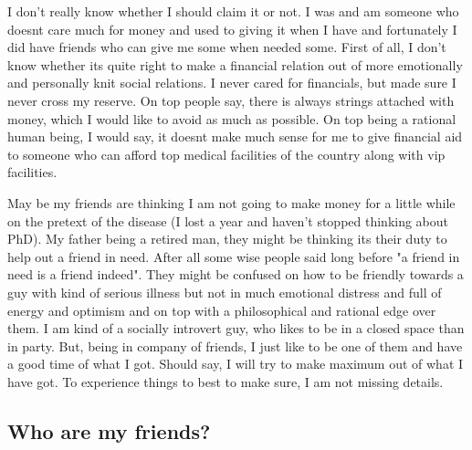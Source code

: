I don't really know whether I should claim it or not. I was and am someone who doesnt care much 
for money and used to giving it when I have and fortunately I did have friends who can give me 
some when needed some. First of all, I don't know whether its quite right to make a financial 
relation out of more emotionally and personally knit social relations. I never cared for financials, 
but made sure I never cross my reserve. On top people say, there is always strings attached with 
money, which I would like to avoid as much as possible. On top being a rational human being, I would 
say, it doesnt make much sense for me to give financial aid to someone who can afford top medical facilities of the country along with vip facilities. 

May be my friends are thinking I am not going to make money for a little while on the pretext of 
the disease (I lost a year and haven't stopped thinking about PhD). My father being a retired man, 
they might be thinking its their duty to help out a friend in need. After all some wise people said 
long before "a friend in need is a friend indeed". They might be confused on how to be friendly 
towards a guy with kind of serious illness but not in much emotional distress and full of energy 
and optimism and on top with a philosophical and rational edge over them. I am kind of a socially
introvert guy, who likes to be in a closed space than in party. But, being in company of friends, 
I just like to be one of them and have a good time of what I got. Should say, I will try to make 
maximum out of what I have got. To experience things to best to make sure, I am not missing details. 

\subsection*{Who are my friends?}

